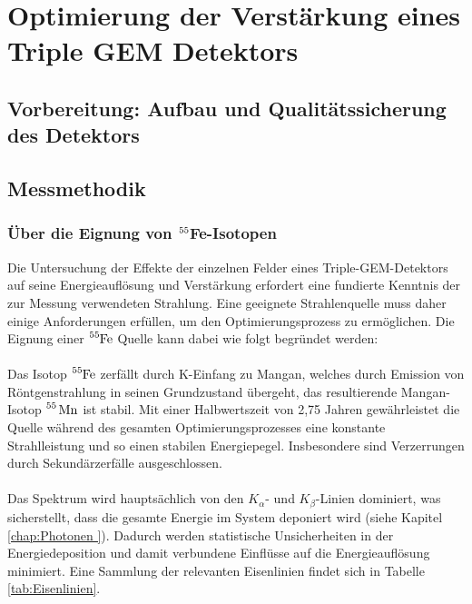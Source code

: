 \chapter{Optimierung der Verstärkung eines Triple GEM Detektors}
	\section{Vorbereitung: Aufbau und Qualitätssicherung des Detektors}
	
	\section{Messmethodik}
		\subsection{Über die Eignung von $\ce{^{55}}$Fe-Isotopen}
			Die Untersuchung der Effekte der einzelnen Felder eines Triple-GEM-Detektors auf seine Energieauflösung und Verstärkung erfordert eine fundierte Kenntnis der zur Messung verwendeten Strahlung. Eine geeignete Strahlenquelle muss daher einige Anforderungen erfüllen, um den Optimierungsprozess zu ermöglichen. Die Eignung einer  $\ce{^55Fe}$ Quelle kann dabei wie folgt begründet werden:\\
			\\
			Das Isotop $\ce{^55Fe}$ zerfällt durch K-Einfang zu Mangan, welches durch Emission von Röntgenstrahlung in seinen Grundzustand übergeht, das resultierende Mangan-Isotop $\ce{^55 Mn}$ ist stabil. Mit einer Halbwertszeit von 2,75 Jahren \cite{Half_Life_FE55} gewährleistet die Quelle während des gesamten Optimierungsprozesses eine konstante Strahlleistung und so einen stabilen Energiepegel. Insbesondere sind Verzerrungen durch Sekundärzerfälle ausgeschlossen.\\
			\\
			Das Spektrum wird hauptsächlich von den $K_{\alpha}$- und $K_{\beta}$-Linien dominiert, was sicherstellt, dass die gesamte Energie im System deponiert wird (siehe Kapitel \ref{chap:Photonen
			}). Dadurch werden statistische Unsicherheiten in der Energiedeposition und damit verbundene Einflüsse auf die Energieauflösung minimiert. Eine Sammlung der relevanten Eisenlinien findet sich in Tabelle \ref{tab:Eisenlinien}.
			
